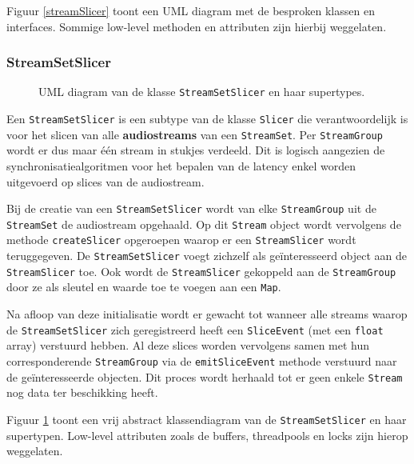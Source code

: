 Figuur \ref{streamSlicer} toont een UML diagram met de besproken klassen en interfaces. Sommige low-level methoden en attributen zijn hierbij weggelaten. 

\subsubsection{StreamSetSlicer}

\begin{figure}[h!]
	\captionsetup{width=0.7\textwidth}
	\caption{UML diagram van de klasse \texttt{StreamSetSlicer} en haar supertypes.}
	\begin{center}
		\advance\parskip0.3cm
		
	\end{center}
	\label{streamSetSlicer}
\end{figure}

Een \texttt{StreamSetSlicer} is een subtype van de klasse \texttt{Slicer} die verantwoordelijk is voor het slicen van alle \textbf{audiostreams} van een \texttt{StreamSet}. Per \texttt{StreamGroup} wordt er dus maar één stream in stukjes verdeeld. Dit is logisch aangezien de synchronisatiealgoritmen voor het bepalen van de latency enkel worden uitgevoerd op slices van de audiostream.

Bij de creatie van een \texttt{StreamSetSlicer} wordt van elke \texttt{StreamGroup} uit de \texttt{StreamSet} de audiostream opgehaald. Op dit \texttt{Stream} object wordt vervolgens de methode \texttt{createSlicer} opgeroepen waarop er een \texttt{StreamSlicer} wordt teruggegeven. De \texttt{StreamSetSlicer} voegt zichzelf als geïnteresseerd object aan de \texttt{StreamSlicer} toe. Ook wordt de \texttt{StreamSlicer}
gekoppeld aan de \texttt{StreamGroup} door ze als sleutel en waarde toe te voegen aan een \texttt{Map}.

Na afloop van deze initialisatie wordt er gewacht tot wanneer alle streams waarop de \texttt{StreamSetSlicer} zich geregistreerd heeft een \texttt{SliceEvent} (met een \texttt{float} array) verstuurd hebben. Al deze slices worden vervolgens samen met hun corresponderende \texttt{StreamGroup} via de \texttt{emitSliceEvent} methode verstuurd naar de geïnteresseerde objecten. Dit proces wordt herhaald tot er geen enkele \texttt{Stream} nog data ter beschikking heeft.

Figuur \ref{streamSetSlicer} toont een vrij abstract klassendiagram van de \texttt{StreamSetSlicer} en haar supertypen. Low-level attributen zoals de buffers, threadpools en locks zijn hierop weggelaten.

